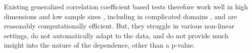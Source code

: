 \documentclass[11pt]{article}
\providecommand{\sct}[1]{{\sc \texttt{#1}}}
\newcommand{\Dcorr}{\sct{Dcorr}}
\begin{document}
Existing generalized correlation coefficient based tests therefore
work well in high dimensions and low sample sizes \cite{SzekelyRizzoBakirov2007,SzekelyRizzo2013a}, including in complicated domains \cite{Lyons2013}, and are reasonably computationally efficient. But, they struggle in various non-linear settings,
do not automatically adapt to the data,
and do not provide much insight into the nature of the dependence, other than a p-value.


\end{document}
